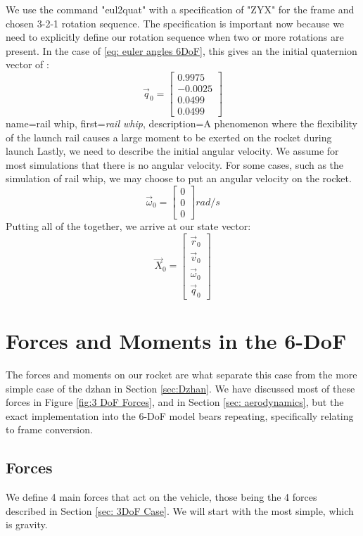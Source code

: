 \documentclass[12pt]{report}
\begin{document}
We use the command "eul2quat" with a specification of "ZYX" for the frame and chosen 3-2-1 rotation sequence. The specification is important now because we need to explicitly define our rotation sequence when two or more rotations are present. In the case of \eqref{eq: euler angles 6DoF}, this gives an the initial \gls{quaternion} vector of :
$$\vec{q}_0=\begin{bmatrix}
    0.9975\\-0.0025\\0.0499\\0.0499
\end{bmatrix}$$
{
    name=rail whip,
    first={\textit{rail whip}},
    description={A phenomenon where the flexibility of the launch rail causes a large moment to be exerted on the rocket during launch}
}
Lastly, we need to describe the initial angular velocity. We assume for most simulations that there is no angular velocity. For some cases, such as the simulation of \gls{rail whip}, we may choose to put an angular velocity on the rocket.
$$\vec{\omega}_0=\begin{bmatrix}
0\\0\\0
\end{bmatrix} rad/s$$
Putting all of the together, we arrive at our \gls{state vector}:
$$\vec{X}_0=\begin{bmatrix}
    \vec{r}_0\\\vec{v}_0\\\vec{\omega}_0\\\vec{q}_0
\end{bmatrix}$$
\section{Forces and Moments in the 6-DoF}
The forces and moments on our rocket are what separate this case from the more simple case of the \gls{dzhan} in Section \ref{sec:Dzhan}. We have discussed most of these forces in Figure \ref{fig:3 DoF Forces}, and in Section \ref{sec: aerodynamics}, but the exact implementation into the 6-DoF model bears repeating, specifically relating to frame conversion.
\subsection{Forces}\label{6DoF Forces}
We define 4 main forces that act on the vehicle, those being the 4 forces described in Section \ref{sec: 3DoF Case}. We will start with the most simple, which is gravity.
\end{document}
